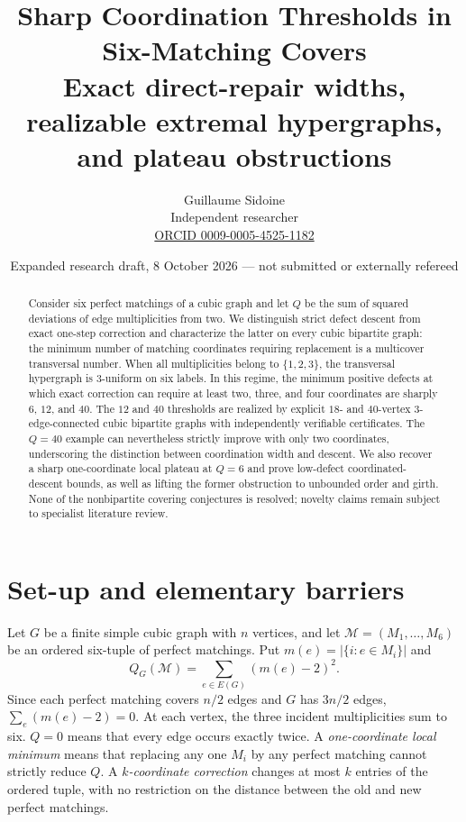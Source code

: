 \documentclass[11pt]{article}
\title{Sharp Coordination Thresholds in Six-Matching Covers\\
\large Exact direct-repair widths, realizable extremal hypergraphs, and plateau obstructions}
\author{Guillaume Sidoine\\Independent researcher\\
\href{https://orcid.org/0009-0005-4525-1182}{ORCID 0009-0005-4525-1182}}
\date{Expanded research draft, 8 October 2026 --- not submitted or externally refereed}
\begin{document}
\maketitle
\begin{abstract}
Consider six perfect matchings of a cubic graph and let $Q$ be the sum
of squared deviations of edge multiplicities from two. We distinguish
strict defect descent from exact one-step correction and characterize
the latter on every cubic bipartite graph: the minimum number of
matching coordinates requiring replacement is a multicover transversal
number. When all multiplicities belong to $\{1,2,3\}$, the transversal
hypergraph is $3$-uniform on six labels. In this regime, the minimum
positive defects at which exact correction can require at least two,
three, and four coordinates are sharply $6$, $12$, and $40$.
The $12$ and $40$ thresholds are realized by explicit $18$- and
$40$-vertex $3$-edge-connected cubic bipartite graphs with independently
verifiable certificates. The $Q=40$ example can nevertheless strictly
improve with only two coordinates, underscoring the distinction between
coordination width and descent. We also recover a sharp one-coordinate
local plateau at $Q=6$ and prove low-defect coordinated-descent bounds,
as well as lifting the former obstruction to unbounded order and girth.
None of the nonbipartite covering conjectures is resolved; novelty
claims remain subject to specialist literature review.
\end{abstract}

\section{Set-up and elementary barriers}
Let $G$ be a finite simple cubic graph with $n$ vertices, and let
$\mathcal M=(M_1,\ldots,M_6)$ be an ordered six-tuple of perfect matchings.
Put $m(e)=|\{i:e\in M_i\}|$ and
\[
 Q_G(\mathcal M)=\sum_{e\in E(G)}(m(e)-2)^2.
\]
Since each perfect matching covers $n/2$ edges and $G$ has $3n/2$
edges, $\sum_e(m(e)-2)=0$. At each vertex, the three incident
multiplicities sum to six. $Q=0$ means that every edge occurs exactly
twice. A \emph{one-coordinate local minimum} means that replacing any
one $M_i$ by any perfect matching cannot strictly reduce $Q$.
A \emph{$k$-coordinate correction} changes at most $k$ entries of the
ordered tuple, with no restriction on the distance between the old
and new perfect matchings.
\end{document}
